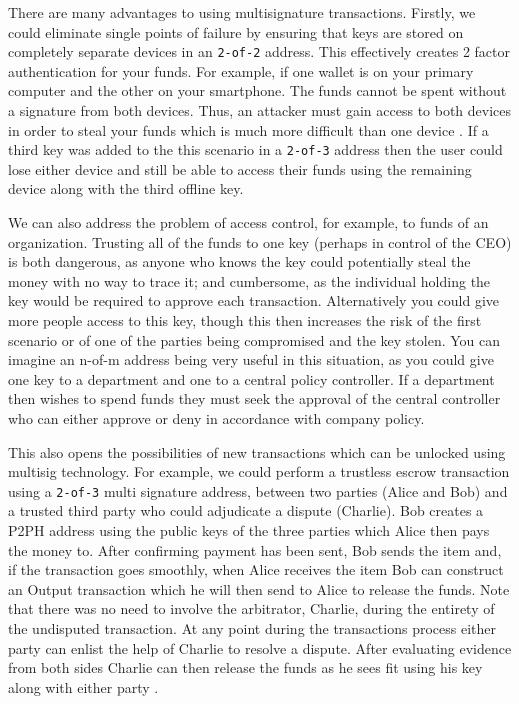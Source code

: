 \documentclass{article}
\begin{document}
There are many advantages to using multisignature transactions. Firstly, we could eliminate single points of failure by ensuring that keys are stored on completely separate devices in an \verb|2-of-2| address. This effectively creates 2 factor authentication for your funds. For example, if one wallet is on your primary computer and the other on your smartphone. The funds cannot be spent without a signature from both devices. Thus, an attacker must gain access to both devices in order to steal your funds which is much more difficult than one device \citep{36_multisignature_bitcoin_wiki_2016}. If a third key was added to the this scenario in a \verb|2-of-3| address then the user could lose either device and still be able to access their funds using the remaining device along with the third offline key.

We can also address the problem of access control, for example, to funds of an organization. Trusting all of the funds to one key (perhaps in control of the CEO) is both dangerous, as anyone who knows the key could potentially steal the money with no way to trace it; and cumbersome, as the individual holding the key would be required to approve each transaction. Alternatively you could give more people access to this key, though this then increases the risk of the first scenario or of one of the parties being compromised and the key stolen. You can imagine an n-of-m address being very useful in this situation, as you could give one key to a department and one to a central policy controller. If a department then wishes to spend funds they must seek the approval of the central controller who can either approve or deny in accordance with company policy.

This also opens the possibilities of new transactions which can be unlocked using multisig technology. For example, we could perform a trustless escrow transaction using a \verb|2-of-3| multi signature address, between two parties (Alice and Bob) and a trusted third party who could adjudicate a dispute (Charlie). Bob creates a P2PH address using the public keys of the three parties which Alice then pays the money to. After confirming payment has been sent, Bob sends the item and, if the transaction goes smoothly, when Alice receives the item Bob can construct an Output transaction which he will then send to Alice to release the funds. Note that there was no need to involve the arbitrator, Charlie, during the entirety of the undisputed transaction. At any point during the transactions process either party can enlist the help of Charlie to resolve a dispute. After evaluating evidence from both sides Charlie can then release the funds as he sees fit using his key along with either party \citep{4_driscoll_2016}\citep{37_davenport_2015}.
\end{document}
